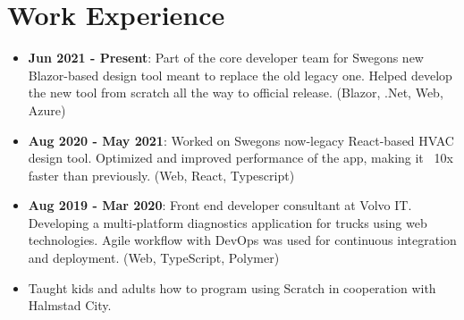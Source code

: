 \documentclass[11pt,a4paper,sans,colorlinks,linkcolor=blue,urlcolor=blue]{moderncv}
\begin{document}
\makecvtitle
\setlength{\parskip}{0.15em}
\vspace{-40.0pt}

\section{Work Experience}
{\begin{itemize}
    \itemsep0.3em
    \setlength{\itemindent}{.25in}
    \item \textbf{Jun 2021 - Present}: Part of the core developer team for Swegons new Blazor-based design tool meant to replace the old legacy one. Helped develop the new tool from scratch all the way to official release. (Blazor, .Net, Web, Azure)
    \item \textbf{Aug 2020 - May 2021}: Worked on Swegons now-legacy React-based HVAC design tool. Optimized and improved performance of the app, making it ~10x faster than previously. (Web, React, Typescript)
\end{itemize}}

{\begin{itemize}
    \itemsep0.3em
    \setlength{\itemindent}{.25in}
    \item \textbf{Aug 2019 - Mar 2020}: Front end developer consultant at Volvo IT. Developing a multi-platform diagnostics application for trucks using web technologies. Agile workflow with DevOps was used for continuous integration and deployment. (Web, TypeScript, Polymer)
\end{itemize}}

{\begin{itemize}
    \itemsep0.3em
    \setlength{\itemindent}{.25in}
    \item Taught kids and adults how to program using Scratch in cooperation with Halmstad City.
\end{itemize}}
\end{document}
